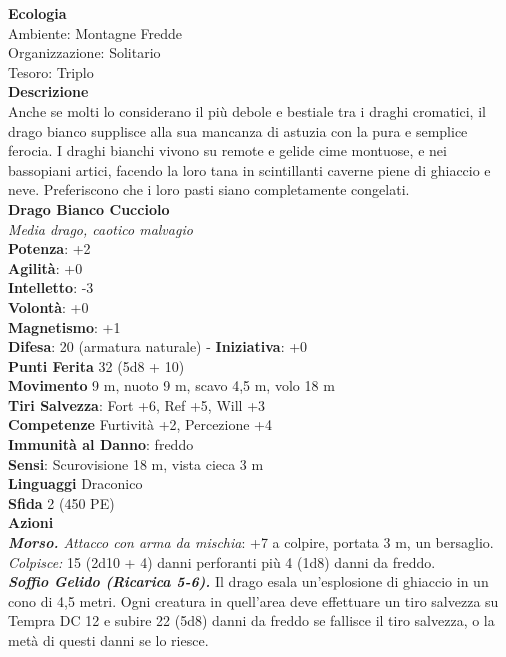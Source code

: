 \begin{multicols}{2}
\textbf{Ecologia}\\
Ambiente: Montagne Fredde\\
Organizzazione: Solitario\\
Tesoro: Triplo\\
\textbf{Descrizione}\\
Anche se molti lo considerano il più debole e bestiale tra i draghi cromatici, il drago bianco supplisce alla sua mancanza di astuzia con la pura e semplice ferocia. I draghi bianchi vivono su remote e gelide cime montuose, e nei bassopiani artici, facendo la loro tana in scintillanti caverne piene di ghiaccio e neve. Preferiscono che i loro pasti siano completamente congelati.\\


\medskip\textbf{Drago Bianco Cucciolo}\\
\emph{Media drago, caotico malvagio}\\
\textbf{Potenza}: +2\\
\textbf{Agilità}: +0\\
\textbf{Intelletto}: -3\\
\textbf{Volontà}: +0\\
\textbf{Magnetismo}: +1\\
\textbf{Difesa}: 20 (armatura naturale) - \textbf{Iniziativa}: +0\\
\textbf{Punti Ferita} 32 (5d8 + 10)\\
\textbf{Movimento} 9 m, nuoto 9 m, scavo 4,5 m, volo 18 m\\
\textbf{Tiri Salvezza}: Fort +6, Ref +5, Will +3\\
\textbf{Competenze} Furtività +2, Percezione +4\\
\textbf{Immunità al Danno}: freddo\\
\textbf{Sensi}: Scurovisione 18 m, vista cieca 3 m\\
\textbf{Linguaggi} Draconico\\
\textbf{Sfida} 2 (450 PE)\smallskip\\
\smallskip\textbf{Azioni}\\
\emph{\textbf{Morso.} Attacco con arma da mischia}: +7 a colpire, portata 3 m, un bersaglio.\\
\emph{Colpisce:} 15 (2d10 + 4) danni perforanti più 4 (1d8) danni da freddo.\\
\emph{\textbf{Soffio Gelido (Ricarica 5-6).}} Il drago esala un'esplosione di ghiaccio in un cono di 4,5 metri. Ogni creatura in quell'area deve effettuare un tiro salvezza su Tempra DC 12 e subire 22 (5d8) danni da freddo se fallisce il tiro salvezza, o la metà di questi danni se lo riesce.

\end{multicols}
